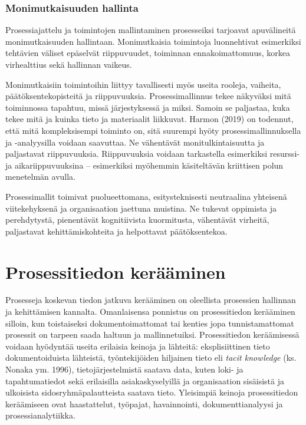 \documentclass[
  finnish,
  letterpaper,
  DIV=11,
  numbers=noendperiod,
  oneside]{scrreprt}
\begin{document}
\subsection{Monimutkaisuuden hallinta}\label{monimutkaisuuden-hallinta}

Prosessiajattelu ja toimintojen mallintaminen prosesseiksi tarjoavat
apuvälineitä monimutkaisuuden hallintaan. Monimutkaisia toimintoja
luonnehtivat esimerkiksi tehtävien väliset epäselvät riippuvuudet,
toiminnan ennakoimattomuus, korkea virhealttius sekä hallinnan vaikeus.

Monimutkaisiin toimintoihin liittyy tavallisesti myös useita rooleja,
vaiheita, päätöksentekopisteitä ja riippuvuuksia. Prosessimallinnus
tekee näkyväksi mitä toiminnossa tapahtuu, missä järjestyksessä ja
miksi. Samoin se paljastaa, kuka tekee mitä ja kuinka tieto ja
materiaalit liikkuvat. Harmon (2019) on todennut, että mitä
kompleksisempi toiminto on, sitä suurempi hyöty prosessimallinnuksella
ja -analyysilla voidaan saavuttaa. Ne vähentävät monitulkintaisuutta ja
paljastavat riippuvuuksia. Riippuvuuksia voidaan tarkastella esimerkiksi
resurssi- ja aikariippuvuuksina -- esimerkiksi myöhemmin käsiteltävän
kriittisen polun menetelmän avulla.

Prosessimallit toimivat puolueettomana, esitysteknisesti neutraalina
yhteisenä viitekehyksenä ja organisaation jaettuna muistina. Ne tukevat
oppimista ja perehdytystä, pienentävät kognitiivista kuormitusta,
vähentävät virheitä, paljastavat kehittämiskohteita ja helpottavat
päätöksentekoa.


\chapter{Prosessitiedon
kerääminen}\label{prosessitiedon-keruxe4uxe4minen}

Prosesseja koskevan tiedon jatkuva kerääminen on oleellista prosessien
hallinnan ja kehittämisen kannalta. Omanlaisensa ponnistus on
prosessitiedon kerääminen silloin, kun toistaiseksi dokumentoimattomat
tai kenties jopa tunnistamattomat prosessit on tarpeen saada haltuun ja
mallinnetuiksi. Prosessitiedon keräämisessä voidaan hyödyntää useita
erilaisia keinoja ja lähteitä: eksplisiittinen tieto dokumentoiduista
lähteistä, työntekijöiden hiljainen tieto eli \emph{tacit knowledge}
(ks. Nonaka ym. 1996), tietojärjestelmistä saatava data, kuten loki- ja
tapahtumatiedot sekä erilaisilla asiakaskyselyillä ja organisaation
sisäisistä ja ulkoisista sidosryhmäpalautteista saatava tieto.
Yleisimpiä keinoja prosessitiedon keräämiseen ovat haastattelut,
työpajat, havainnointi, dokumenttianalyysi ja prosessianalytiikka.
\end{document}

